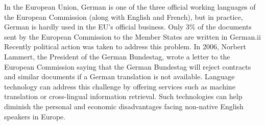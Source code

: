 \documentclass[]{../metanetpaper}
\begin{document}
In the European Union, German is one of the three official working languages of the European Commission (along with English and French), but in practice, German is hardly used in the EU’s official business. Only 3\% of the documents sent by the European Commission to the Member States are written in German.ii Recently political action was taken to address this problem. In 2006, Norbert Lammert, the President of the German Bundestag, wrote a letter to the European Commission saying that the German Bundestag will reject contracts and similar documents if a German translation is not available. Language technology can address this challenge by offering services such as machine translation or cross-lingual information retrieval. Such technologies can help diminish the personal and economic disadvantages facing non-native English speakers in Europe.
	
\end{document}
